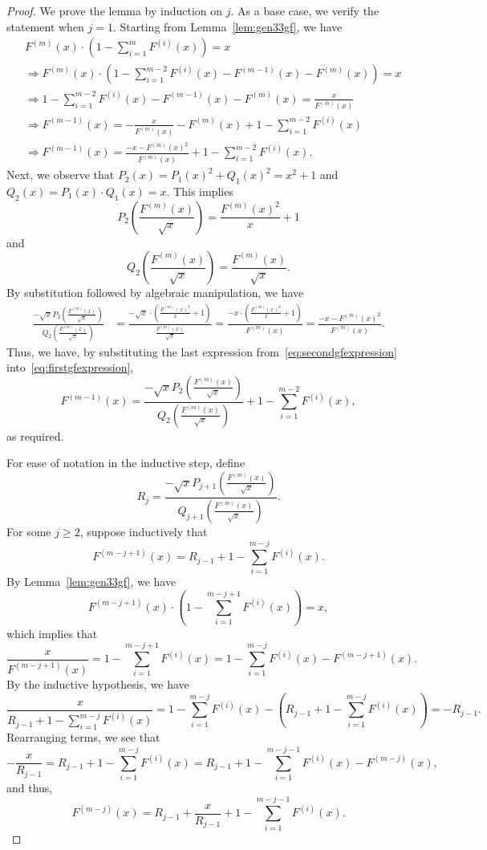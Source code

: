 \documentclass[12pt]{amsart}
\newcommand{\gfnoa}[1]{F^{(#1)}(x)}
\begin{document}
\begin{proof}
    We prove the lemma by induction on $j$. As a base case, we verify the statement when $j=1$. Starting from Lemma~\ref{lem:gen33gf}, we have
    \begin{align}
        &\nonumber \gfnoa{m}\cdot\left(1-\sum_{i=1}^{m}\gfnoa{i}\right)=x\\
        &\nonumber \Rightarrow\gfnoa{m}\cdot\left(1-\sum_{i=1}^{m-2}\gfnoa{i}-\gfnoa{m-1}-\gfnoa{m}\right)=x\\
        &\nonumber \Rightarrow1-\sum_{i=1}^{m-2}\gfnoa{i}-\gfnoa{m-1}-\gfnoa{m}=\frac{x}{\gfnoa{m}}\\
        &\nonumber \Rightarrow\gfnoa{m-1}=-\frac{x}{\gfnoa{m}}-\gfnoa{m}+1-\sum_{i=1}^{m-2}\gfnoa{i}\\
        &\Rightarrow\gfnoa{m-1}=\frac{-x-\gfnoa{m}^2}{\gfnoa{m}}+1-\sum_{i=1}^{m-2}\gfnoa{i}\label{eq:firstgfexpression}.
    \end{align}
    Next, we observe that $P_2(x)=P_1(x)^2+Q_1(x)^2=x^2+1$ and $Q_2(x)=P_1(x)\cdot Q_1(x)=x$. This implies
    \[
    P_2\!\left(\frac{\gfnoa{m}}{\sqrt{x}}\right)=\frac{\gfnoa{m}^2}{x}+1
    \]
    and
    \[
    Q_2\!\left(\frac{\gfnoa{m}}{\sqrt{x}}\right)=\frac{\gfnoa{m}}{\sqrt{x}}.
    \]
    By substitution followed by algebraic manipulation, we have 
    \begin{align}
    \frac{-\sqrt{x}P_{2}\!\left(\frac{\gfnoa{m}}{\sqrt{x}}\right)}{Q_{2}\!\left(\frac{\gfnoa{m}}{\sqrt{x}}\right)}&=\frac{-\sqrt{x}\cdot\left(\frac{\gfnoa{m}^2}{x}+1\right)}{\frac{\gfnoa{m}}{\sqrt{x}}}
    =\frac{-x\cdot\left(\frac{\gfnoa{m}^2}{x}+1\right)}{\gfnoa{m}}
    =\frac{-x-\gfnoa{m}^2}{\gfnoa{m}}\label{eq:secondgfexpression}.
    \end{align}
    Thus, we have, by substituting the last expression from~\eqref{eq:secondgfexpression} into~\eqref{eq:firstgfexpression}, 
    \[
    \gfnoa{m-1}=\frac{-\sqrt{x}P_{2}\!\left(\frac{\gfnoa{m}}{\sqrt{x}}\right)}{Q_{2}\!\left(\frac{\gfnoa{m}}{\sqrt{x}}\right)}+1-\sum_{i=1}^{m-2}\gfnoa{i},
    \]
    as required.

    For ease of notation in the inductive step, define
    \[
    R_j=\frac{-\sqrt{x}P_{j+1}\!\left(\frac{\gfnoa{m}}{\sqrt{x}}\right)}{Q_{j+1}\!\left(\frac{\gfnoa{m}}{\sqrt{x}}\right)}.
    \]
    For some $j\geq2$, suppose inductively that
    \[
    \gfnoa{m-j+1}=R_{j-1}+1-\sum_{i=1}^{m-j}\gfnoa{i}.
    \]
    By Lemma~\ref{lem:gen33gf}, we have
    \[
    \gfnoa{m-j+1}\cdot\left(1-\sum_{i=1}^{m-j+1}\gfnoa{i}\right)=x,
    \]
    which implies that
    \[
    \frac{x}{\gfnoa{m-j+1}}=1-\sum_{i=1}^{m-j+1}\gfnoa{i}=1-\sum_{i=1}^{m-j}\gfnoa{i}-\gfnoa{m-j+1}.
    \]
    By the inductive hypothesis, we have
    \[
    \frac{x}{R_{j-1}+1-\sum_{i=1}^{m-j}\gfnoa{i}}=1-\sum_{i=1}^{m-j}\gfnoa{i}-\left(R_{j-1}+1-\sum_{i=1}^{m-j}\gfnoa{i}\right)=-R_{j-1}.
    \]
    Rearranging terms, we see that
    \[
    -\frac{x}{R_{j-1}}=R_{j-1}+1-\sum_{i=1}^{m-j}\gfnoa{i}=R_{j-1}+1-\sum_{i=1}^{m-j-1}\gfnoa{i}-\gfnoa{m-j},
    \]
    and thus,
    \[
    \gfnoa{m-j}=R_{j-1}+\frac{x}{R_{j-1}}+1-\sum_{i=1}^{m-j-1}\gfnoa{i}.
    \]


\end{proof}
\end{document}
